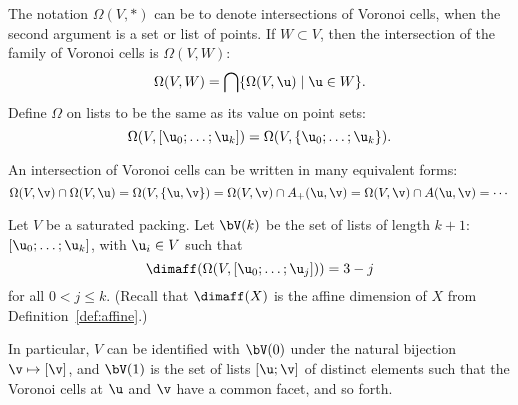 \begin{definition}
The notation $\Omega(V,*)$ can be  to denote intersections
of Voronoi cells, when the second argument is a set or list of points.
If $W\subset V$, %
then the intersection of the family of Voronoi cells is  $\Omega(V,W)$:
\begin{displaymath}\Omega(V,W) = \bigcap \{\Omega(V, \u)\mid \u\in W
\}.\end{displaymath}
Define $\Omega$ on lists %
to be the same as its value on point sets: 
\begin{displaymath}
\Omega(V,[\u_0;\ldots;\u_k]) = \Omega(V,\{\u_0;\ldots;\u_k\}).
\end{displaymath}
\end{definition}

An intersection of Voronoi cells can be written in many equivalent forms:
\begin{displaymath}
\Omega(V,\v)\cap \Omega(V,\u) =\Omega(V,\{\u,\v\})= \Omega(V,\v)\cap A_+(\u,\v) 
= \Omega(V,\v)\cap A(\u,\v) =  \cdots
\end{displaymath}





\begin{definition}[$\bV$]
Let $V$ be a saturated packing.
Let $ \bV(k)$ be the set of lists of length $k+1$:
$[\u_0;\ldots;\u_k]$, with $ \u_i\in V$ such that
\begin{equation}\label{eqn:omega-dim}
\dimaff(\Omega(V,[\u_0;\ldots;\u_j])) = 3-j
\end{equation}
for all $0<j\le k$.
(Recall that   $\dimaff(X)$ is the affine dimension of $X$ from Definition~\ref{def:affine}.)
%
\end{definition}

In particular, $V$ can be identified with $\bV(0)$ under the natural
bijection $\v\mapsto[\v]$, and $\bV(1)$ is the set of lists $[\u;\v]$
of distinct elements such that the Voronoi cells at $ \u$ and $\v$
have a common facet, and so forth.  

